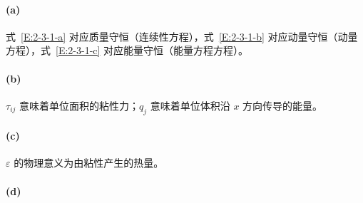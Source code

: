 \paragraph{(a)}
式~\eqref{E:2-3-1-a} 对应质量守恒（连续性方程），式~\eqref{E:2-3-1-b} 对应动量守恒（动量方程），式~\eqref{E:2-3-1-c} 对应能量守恒（能量方程方程）。

\paragraph{(b)}
$\tau_{ij}$ 意味着单位面积的粘性力；$q_j$ 意味着单位体积沿 $x$ 方向传导的能量。

\paragraph{(c)}
$\varepsilon$ 的物理意义为由粘性产生的热量。

\paragraph{(d)}

